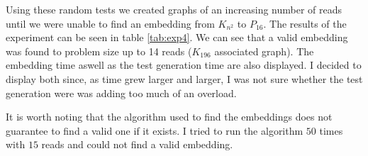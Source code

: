 Using these random tests we created graphs of an increasing number of reads until we were unable to find an embedding from $K_{n^2}$ to $P_{16}$. The results of the experiment can be seen in table \ref{tab:exp4}. We can see that a valid embedding was found to problem size up to 14 reads ($K_{196}$ associated graph). The embedding time aswell as the test generation time are also displayed. I decided to display both since, as time grew larger and larger, I was not sure whether the test generation were was adding too much of an overload.

\begin{table}[H]
	\centering
	\caption{Results of experiment 4}
	\label{tab:exp4}
\end{table}

It is worth noting that the algorithm used to find the embeddings does not guarantee to find a valid one if it exists. I tried to run the algorithm $50$ times with $15$ reads and could not find a valid embedding.


